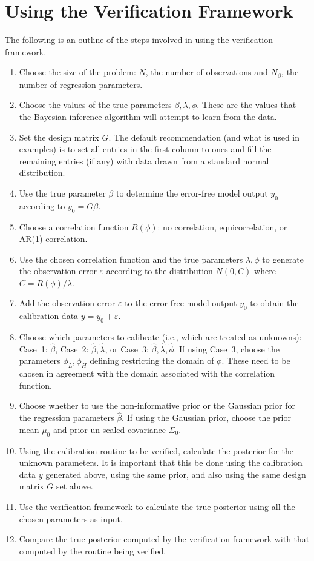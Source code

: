 \documentclass{book}
\begin{document}
\chapter{Using the Verification Framework}
The following is an outline of the steps involved in using the verification framework.
\begin{enumerate}
\item Choose the size of the problem: $N$, the number of observations and $N_\beta$, the number of
	regression parameters. 
\item Choose the values of the true parameters $\beta, \lambda, \phi$. These are the values that the Bayesian inference
	algorithm will attempt to learn from the data. 
\item Set the design matrix $G$. The default recommendation (and what is used in examples) is to set all entries in the first
	column to ones and fill the remaining entries (if any) with data drawn from a standard normal distribution.
\item Use the true parameter $\beta$ to determine the error-free model output $y_0$ according to $y_0 = G\beta$. 
\item Choose a correlation function $R(\phi)$: no correlation, equicorrelation, or AR(1) correlation. 
\item Use the chosen correlation function and the true parameters $\lambda, \phi$ to generate the observation error
	$\varepsilon$ according to the distribution $N(0, C)$ where $C = R(\phi) / \lambda$. 
\item Add the observation error $\varepsilon$ to the error-free model output $y_0$ to obtain the calibration data 
	$y = y_0 + \varepsilon$. 
\item Choose which parameters to calibrate (i.e., which are treated as unknowns): 
	Case~1: $\hat \beta$, 
	Case~2: $\hat\beta, \hat \lambda$, or
	Case~3: $\hat\beta, \hat \lambda, \hat \phi$. If using Case~3, choose the parameters $\phi_L, \phi_H$ defining
	restricting the domain of $\phi$. These need to be chosen in agreement with the domain associated with the
	correlation function. 
\item Choose whether to use the non-informative prior or the Gaussian prior for the regression parameters $\hat \beta$.
	If using the Gaussian prior, choose the prior mean $\mu_0$ and prior un-scaled covariance $\Sigma_0$.
\item Using the calibration routine to be verified, calculate the posterior for the unknown parameters. It is important that this 
	be done using the calibration data $y$ generated above, using the same prior, and also using the same design
	matrix $G$ set above.
\item Use the verification framework to calculate the true posterior using all the chosen parameters as input.
\item Compare the true posterior computed by the verification framework with that computed by the routine being verified.
\end{enumerate}
\end{document}
